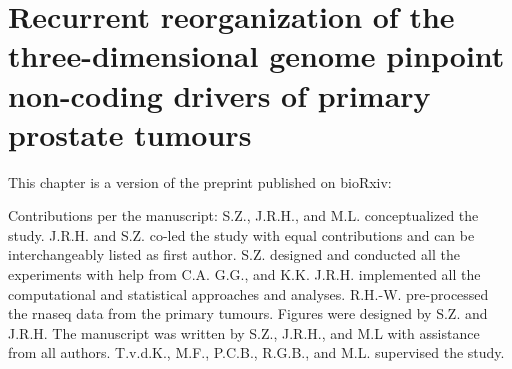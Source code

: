 \chapter{Recurrent reorganization of the three-dimensional genome pinpoint non-coding drivers of primary prostate tumours}
\label{chap:3D}

This chapter is a version of the preprint published on bioRxiv:


\vspace{1em}

Contributions per the manuscript:
S.Z., J.R.H., and M.L. conceptualized the study.
J.R.H. and S.Z. co-led the study with equal contributions and can be interchangeably listed as first author.
S.Z. designed and conducted all the experiments with help from C.A. G.G., and K.K.
J.R.H. implemented all the computational and statistical approaches and analyses.
R.H.-W. pre-processed the \gls{rnaseq} data from the primary tumours.
Figures were designed by S.Z. and J.R.H.
The manuscript was written by S.Z., J.R.H., and M.L with assistance from all authors.
T.v.d.K., M.F., P.C.B., R.G.B., and M.L. supervised the study.






